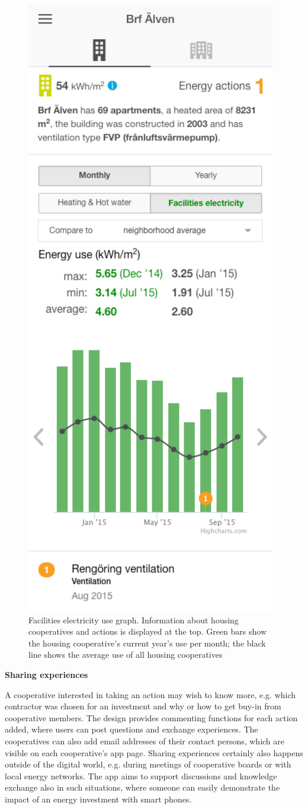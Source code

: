 \begin{figure}
\centering
\includegraphics[width=.42\linewidth]{img/brf.pdf}
\caption{Facilities electricity use graph. Information about housing cooperatives and actions is displayed at the top. Green bars show the housing cooperative's current year's use per month; the black line shows the average use of all housing cooperatives}
\label{fig:Figure204_Neighbourhood_average} 
\end{figure}

\textbf{Sharing experiences}


A cooperative interested in taking an action may wish to know more, e.g. which contractor was chosen for an investment and why or how to get buy-in from cooperative members. The design provides commenting functions for each action added, where users can post questions and exchange experiences. The cooperatives can also add email addresses of their contact persons, which are visible on each cooperative's app page.
% 
Sharing experiences certainly also happens outside of the digital world, e.g. during meetings of cooperative boards or with local energy networks. The app aims  to support discussions and knowledge exchange also in such situations, where someone can easily demonstrate the impact of an energy investment with smart phones.



